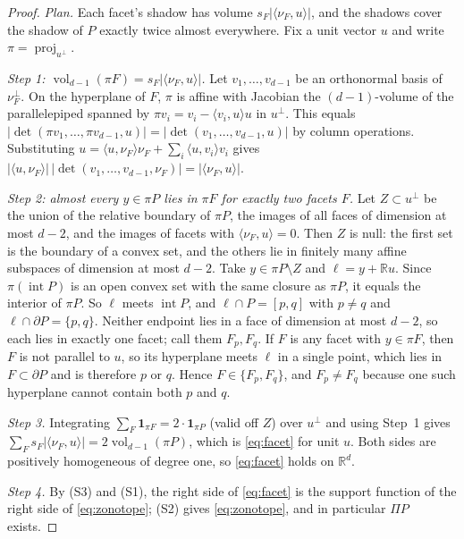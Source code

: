 \documentclass[11pt]{article}
\newcommand{\R}{\mathbb R}
\DeclareMathOperator{\vol}{vol}
\DeclareMathOperator{\proj}{proj}
\begin{document}
\begin{proof}
\emph{Plan.} Each facet's shadow has volume \(s_F|\langle\nu_F,u\rangle|\), and the shadows cover the shadow of \(P\) exactly twice almost everywhere. Fix a unit vector \(u\) and write \(\pi=\proj_{u^\perp}\).

\emph{Step 1: \(\vol_{d-1}(\pi F)=s_F|\langle\nu_F,u\rangle|\).} Let \(v_1,\dots,v_{d-1}\) be an orthonormal basis of \(\nu_F^\perp\). On the hyperplane of \(F\), \(\pi\) is affine with Jacobian the \((d-1)\)-volume of the parallelepiped spanned by \(\pi v_i=v_i-\langle v_i,u\rangle u\) in \(u^\perp\). This equals \(|\det(\pi v_1,\dots,\pi v_{d-1},u)|=|\det(v_1,\dots,v_{d-1},u)|\) by column operations. Substituting \(u=\langle u,\nu_F\rangle\nu_F+\sum_i\langle u,v_i\rangle v_i\) gives \(|\langle u,\nu_F\rangle|\,|\det(v_1,\dots,v_{d-1},\nu_F)|=|\langle\nu_F,u\rangle|\).

\emph{Step 2: almost every \(y\in\pi P\) lies in \(\pi F\) for exactly two facets \(F\).} Let \(Z\subset u^\perp\) be the union of the relative boundary of \(\pi P\), the images of all faces of dimension at most \(d-2\), and the images of facets with \(\langle\nu_F,u\rangle=0\). Then \(Z\) is null: the first set is the boundary of a convex set, and the others lie in finitely many affine subspaces of dimension at most \(d-2\). Take \(y\in\pi P\setminus Z\) and \(\ell=y+\R u\). Since \(\pi(\operatorname{int}P)\) is an open convex set with the same closure as \(\pi P\), it equals the interior of \(\pi P\). So \(\ell\) meets \(\operatorname{int}P\), and \(\ell\cap P=[p,q]\) with \(p\ne q\) and \(\ell\cap\partial P=\{p,q\}\). Neither endpoint lies in a face of dimension at most \(d-2\), so each lies in exactly one facet; call them \(F_p,F_q\). If \(F\) is any facet with \(y\in\pi F\), then \(F\) is not parallel to \(u\), so its hyperplane meets \(\ell\) in a single point, which lies in \(F\subset\partial P\) and is therefore \(p\) or \(q\). Hence \(F\in\{F_p,F_q\}\), and \(F_p\ne F_q\) because one such hyperplane cannot contain both \(p\) and \(q\).

\emph{Step 3.} Integrating \(\sum_F\mathbf 1_{\pi F}=2\cdot\mathbf 1_{\pi P}\) (valid off \(Z\)) over \(u^\perp\) and using Step~1 gives \(\sum_Fs_F|\langle\nu_F,u\rangle|=2\vol_{d-1}(\pi P)\), which is \eqref{eq:facet} for unit \(u\). Both sides are positively homogeneous of degree one, so \eqref{eq:facet} holds on \(\R^d\).

\emph{Step 4.} By (S3) and (S1), the right side of \eqref{eq:facet} is the support function of the right side of \eqref{eq:zonotope}; (S2) gives \eqref{eq:zonotope}, and in particular \(\Pi P\) exists.
\end{proof}
\end{document}
